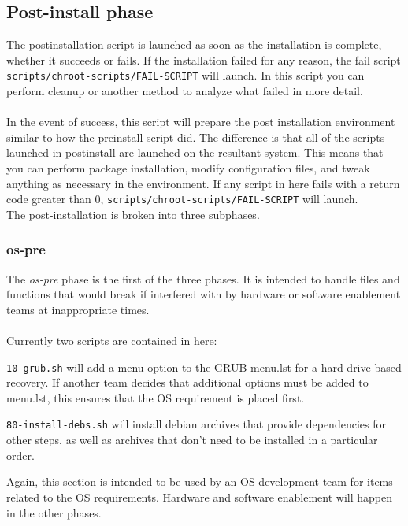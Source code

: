 \documentclass[letterpaper,10pt,titlepage]{article}
\begin{document}
\subsection{Post-install phase}
The postinstallation script is launched as soon as the installation is complete, whether it succeeds or fails.  If the installation failed for any reason, the fail script \texttt{scripts/chroot-scripts/FAIL-SCRIPT} will launch.  In this script you can perform cleanup or another method to analyze what failed in more detail.
\\
\\
In the event of success, this script will prepare the post installation environment similar to how the preinstall script did.  The difference is that all of the scripts launched in postinstall are launched on the resultant system.  This means that you can perform package installation, modify configuration files, and tweak anything as necessary in the environment.  If any script in here fails with a return code greater than 0, \texttt{scripts/chroot-scripts/FAIL-SCRIPT} will launch.
\\
The post-installation is broken into three subphases.

\subsubsection{os-pre}
The \textit{os-pre} phase is the first of the three phases.  It is intended to handle files and functions that would break if interfered with by hardware or software enablement teams at inappropriate times.
\\
\\
Currently two scripts are contained in here:
\begin{list}{}
\item \texttt{10-grub.sh} will add a menu option to the GRUB menu.lst for a hard drive based recovery.  If another team decides that additional options must be added to menu.lst, this ensures that the OS requirement is placed first.
\item \texttt{80-install-debs.sh} will install debian archives that provide dependencies for other steps, as well as archives that don't need to be installed in a particular order.
\\
\end{list}
Again, this section is intended to be used by an OS development team for items related to the OS requirements.  Hardware and software enablement will happen in the other phases.
\end{document}
